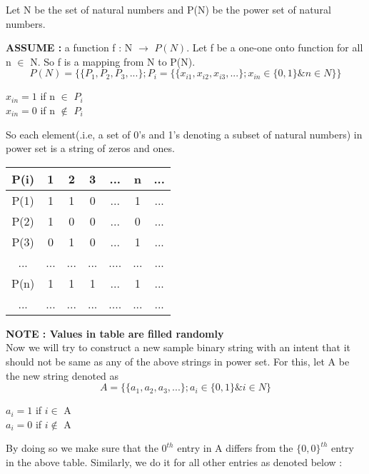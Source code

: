 \documentclass[14pt, letterpaper]{article}
\begin{document}
 
Let N be the set of natural numbers and P(N) be the power set of natural numbers.

\textbf{ASSUME : } a function f : N $\to$ $P(N)$. Let f be a one-one onto function for all n $\in$ N.
So f is a mapping from N to P(N).
\[ P(N) = \{ \{P_1,P_2,P_3,...\}; P_i = \{ \{x_{i1},x_{i2},x_{i3},...\}; x_{in} \in \{0,1\} \& n \in N \} \}  \]
\begin{center}
$x_{in}=1$ if n $\in$ $P_i$ \\
$x_{in}=0$ if n $\notin$ $P_i$ \\
\end{center}
So each element(.i.e, a set of 0's and 1's denoting a subset of natural numbers) in power set is a string of zeros and ones.
\begin{center}
    \begin{tabular}{|c|c|c|c|c|c|c|}
        \hline
        P(i) & 1 & 2 & 3 & ... & n & ...\\
        \hline
        \hline
        P(1) & 1 & 1 & 0 & ... & 1 & ... \\
        \hline
        P(2) & 1 & 0 & 0 & ... & 0 & ... \\ 
        \hline
        P(3) & 0 & 1 & 0 & ... & 1 & ... \\ 
        \hline
        ... & ... & ... & ... & .... & ... & ... \\ 
        \hline
        P(n) & 1 & 1 & 1 & ... & 1 & ... \\ 
        \hline
        ... & ... & ... & ... & .... & ... & ... \\
        \hline
    \end{tabular} 
\end{center}
\textbf{NOTE : Values in table are filled randomly}\\
Now we will try to construct a new sample binary string with an intent that it should not be same as any of the above strings in power set. For this, let A be the new string denoted as \\
\[ A = \{ \{a_1,a_2,a_3,...\}; a_{i} \in \{0,1\} \& i \in N \}  \]
\begin{center}
$a_{i}=1$ if $ i \in$ A \\
$a_{i}=0$ if $ i \notin$ A \\
\end{center}
By doing so we make sure that the $0^{th}$ entry in A differs from the $\{0,0\}^{th}$ entry in the above table. Similarly, we do it for all other entries as denoted below : \\
\end{document}

